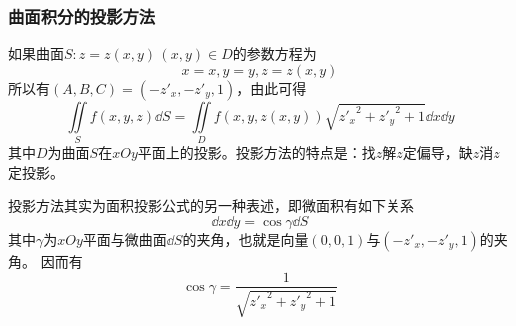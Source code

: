 \subsubsection{曲面积分的投影方法}
如果曲面$S: z=z(x,y)\,(x,y)\in D$的参数方程为
\[ x=x, y=y, z=z(x,y) \]
所以有$(A,B,C)=(-z'_x,-z'_y,1)$，由此可得
\begin{equation}
    \iint\limits_S f(x,y,z)\dd{S} = \iint\limits_D f(x,y,z(x,y))\sqrt{{z'_x}^2 + {z'_y}^2 + 1}\dd{x}\dd{y}
\end{equation}
其中$D$为曲面$S$在$xOy$平面上的投影。投影方法的特点是：找$z$解$z$定偏导，缺$z$消$z$定投影。

投影方法其实为面积投影公式的另一种表述，即微面积有如下关系
\[ \dd{x}\dd{y} = \cos\gamma\dd{S} \]
其中$\gamma$为$xOy$平面与微曲面$\dd{S}$的夹角，也就是向量$(0,0,1)$与$(-z'_x, -z'_y, 1)$的夹角。
因而有
\[ \cos\gamma = \frac{1}{\sqrt{{z'_x}^2 + {z'_y}^2 + 1}} \]

